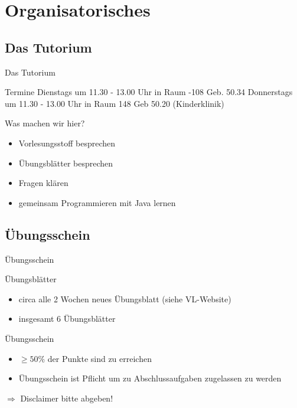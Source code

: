 \documentclass[18pt]{beamer}
\begin{document}
\section{Organisatorisches}
\subsection{Das Tutorium}
\begin{frame}{Das Tutorium}
\begin{block}{Termine}
	Dienstags um 11.30 - 13.00 Uhr in Raum -108 Geb. 50.34 	\newline
 Donnerstags um 11.30 - 13.00 Uhr in Raum 148 Geb 50.20 (Kinderklinik)
\end{block}
\begin{block}{Was machen wir hier?}
	\begin{itemize}
		\item Vorlesungsstoff besprechen
		\item Übungsblätter besprechen
		\item Fragen klären
		\item gemeinsam Programmieren mit Java lernen
	\end{itemize}
\end{block}
\end{frame}

\subsection{Übungsschein}
\begin{frame}{Übungsschein}
	\begin{block}{Übungsblätter}
		\begin{itemize}
			\item circa alle 2 Wochen neues Übungsblatt (siehe VL-Website)
			\item insgesamt 6 Übungsblätter
		\end{itemize}
	\end{block}
	\pause
	\begin{block}{Übungsschein}
		\begin{itemize}
			\item $\geq 50\%$ der Punkte sind zu erreichen
			\item Übungsschein ist Pflicht um zu Abschlussaufgaben zugelassen zu werden
		\end{itemize}
	\end{block}
	\huge{$\Rightarrow$ Disclaimer bitte abgeben!}
\end{frame}
\end{document}
